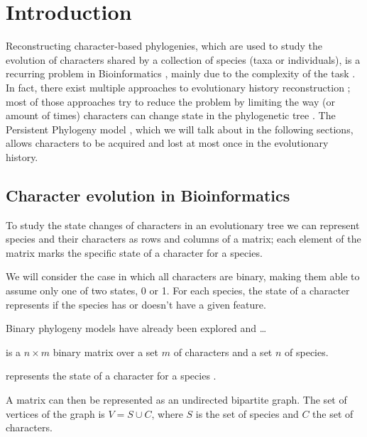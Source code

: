 
\section{Introduction}\label{sec:introduction}


Reconstructing character-based phylogenies, which are used to study the evolution of characters shared by a collection of species (taxa or individuals), is a recurring problem in Bioinformatics , mainly due to the complexity of the task . In fact, there exist multiple approaches to evolutionary history reconstruction ; most of those approaches try to reduce the problem by limiting the way (or amount of times) characters can change state in the phylogenetic tree \cite{doi:10.1137/S0097539793244587} . The Persistent Phylogeny model , which we will talk about in the following sections, allows characters to be acquired and lost at most once in the evolutionary history.

\subsection{Character evolution in Bioinformatics}\label{ssec:charevo}


To study the state changes of characters in an evolutionary tree we can represent species and their characters as rows and columns of a matrix; each element of the matrix marks the specific state of a character for a species.

We will consider the case in which all characters are binary, making them able to assume only one of two states, 0 or 1. For each species, the state of a character represents if the species has or doesn't have a given feature.

Binary phylogeny models have already been explored  and \dots

\begin{definition}\label{def:m}
  \m{} is a $n \times m$ binary matrix over a set $m$ of characters and a set $n$ of species.

  \m[i][j] represents the state of a character \character[j] for a species \species[i].
\end{definition}

A matrix \m{} can then be represented as an undirected bipartite graph. The set of vertices of the graph is $V = S \cup C$, where $S$ is the set of species and $C$ the set of characters.

